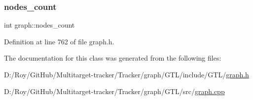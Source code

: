 \subsubsection{\texorpdfstring{nodes\+\_\+count}{nodes\_count}}
{\footnotesize\ttfamily int graph\+::nodes\+\_\+count\hspace{0.3cm}{\ttfamily [private]}}



Definition at line 762 of file graph.\+h.



The documentation for this class was generated from the following files\+:\begin{DoxyCompactItemize}
\item 
D\+:/\+Roy/\+Git\+Hub/\+Multitarget-\/tracker/\+Tracker/graph/\+G\+T\+L/include/\+G\+T\+L/\mbox{\hyperlink{graph_8h}{graph.\+h}}\item 
D\+:/\+Roy/\+Git\+Hub/\+Multitarget-\/tracker/\+Tracker/graph/\+G\+T\+L/src/\mbox{\hyperlink{graph_8cpp}{graph.\+cpp}}\end{DoxyCompactItemize}
